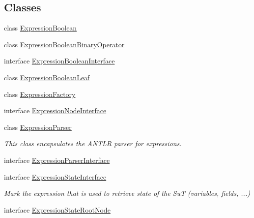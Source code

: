 \subsection*{Classes}
\begin{DoxyCompactItemize}
\item 
class \hyperlink{classgov_1_1nasa_1_1jpf_1_1inspector_1_1server_1_1expression_1_1_expression_boolean}{Expression\+Boolean}
\item 
class \hyperlink{classgov_1_1nasa_1_1jpf_1_1inspector_1_1server_1_1expression_1_1_expression_boolean_binary_operator}{Expression\+Boolean\+Binary\+Operator}
\item 
interface \hyperlink{interfacegov_1_1nasa_1_1jpf_1_1inspector_1_1server_1_1expression_1_1_expression_boolean_interface}{Expression\+Boolean\+Interface}
\item 
class \hyperlink{classgov_1_1nasa_1_1jpf_1_1inspector_1_1server_1_1expression_1_1_expression_boolean_leaf}{Expression\+Boolean\+Leaf}
\item 
class \hyperlink{classgov_1_1nasa_1_1jpf_1_1inspector_1_1server_1_1expression_1_1_expression_factory}{Expression\+Factory}
\item 
interface \hyperlink{interfacegov_1_1nasa_1_1jpf_1_1inspector_1_1server_1_1expression_1_1_expression_node_interface}{Expression\+Node\+Interface}
\item 
class \hyperlink{classgov_1_1nasa_1_1jpf_1_1inspector_1_1server_1_1expression_1_1_expression_parser}{Expression\+Parser}
\begin{DoxyCompactList}\small\item\em This class encapsulates the A\+N\+T\+LR parser for expressions. \end{DoxyCompactList}\item 
interface \hyperlink{interfacegov_1_1nasa_1_1jpf_1_1inspector_1_1server_1_1expression_1_1_expression_parser_interface}{Expression\+Parser\+Interface}
\item 
interface \hyperlink{interfacegov_1_1nasa_1_1jpf_1_1inspector_1_1server_1_1expression_1_1_expression_state_interface}{Expression\+State\+Interface}
\begin{DoxyCompactList}\small\item\em Mark the expression that is used to retrieve state of the SuT (variables, fields, ...) \end{DoxyCompactList}\item 
interface \hyperlink{interfacegov_1_1nasa_1_1jpf_1_1inspector_1_1server_1_1expression_1_1_expression_state_root_node}{Expression\+State\+Root\+Node}

\end{DoxyCompactItemize}
